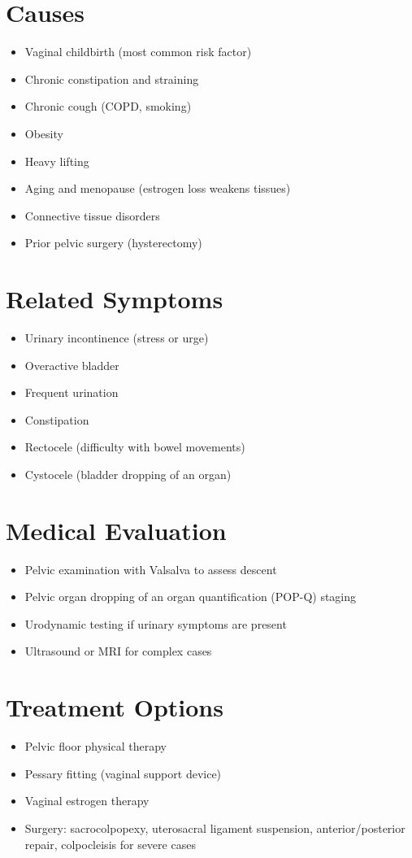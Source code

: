 \section*{Causes}
\begin{itemize}
\item Vaginal childbirth (most common risk factor)
\item Chronic constipation and straining
\item Chronic cough (COPD, smoking)
\item Obesity
\item Heavy lifting
\item Aging and menopause (estrogen loss weakens tissues)
\item Connective tissue disorders
\item Prior pelvic surgery (hysterectomy)
\end{itemize}

\section*{Related Symptoms}
\begin{itemize}
\item Urinary incontinence (stress or urge)
\item Overactive bladder
\item Frequent urination
\item Constipation
\item Rectocele (difficulty with bowel movements)
\item Cystocele (bladder dropping of an organ)
\end{itemize}

\section*{Medical Evaluation}
\begin{itemize}
\item Pelvic examination with Valsalva to assess descent
\item Pelvic organ dropping of an organ quantification (POP-Q) staging
\item Urodynamic testing if urinary symptoms are present
\item Ultrasound or MRI for complex cases
\end{itemize}

\section*{Treatment Options}
\begin{itemize}
\item Pelvic floor physical therapy
\item Pessary fitting (vaginal support device)
\item Vaginal estrogen therapy
\item Surgery: sacrocolpopexy, uterosacral ligament suspension, anterior/posterior repair, colpocleisis for severe cases
\end{itemize}

